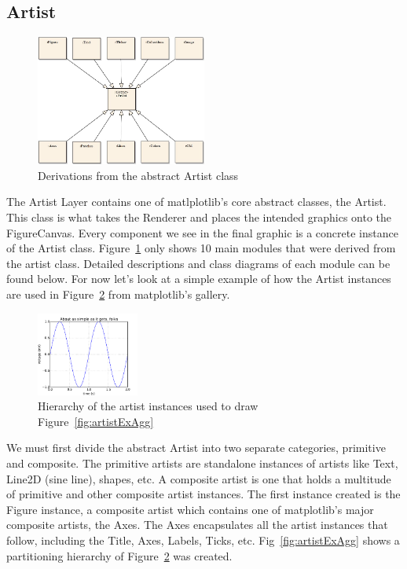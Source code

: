 \documentclass[pdftex,10pt,a4paper]{report}
\begin{document}
\subsection{Artist}
\begin{figure}[ht!]
        \centering
                \includegraphics[width=0.5\textwidth]{img/umls/arch/absArtist}
        \caption{Derivations from the abstract Artist class}\label{fig:absArtist}
\end{figure}
The Artist Layer contains one of matlplotlib's core abstract classes, the Artist. This class is what takes the Renderer and places the intended graphics onto the FigureCanvas. Every component we see in the final graphic is a concrete instance of the Artist class. Figure~\ref{fig:absArtist} only shows 10 main modules that were derived from the artist class. Detailed descriptions and class diagrams of each module can be found below. For now let's look at a simple example of how the Artist instances are used in Figure~\ref{fig:artistEx} from matplotlib's gallery.

\begin{figure}[ht!]
        \centering
                \includegraphics[width=0.3\textwidth]{img/examples/simple_plot}
        \caption{Hierarchy of the artist instances used to draw Figure~\ref{fig:artistExAgg}}\label{fig:artistEx}
\end{figure}

We must first divide the abstract Artist into two separate categories, primitive and composite. The primitive artists are standalone instances of artists like Text, Line2D (sine line), shapes, etc. A composite artist is one that holds a multitude of primitive and other composite artist instances. The first instance created is the Figure instance, a composite artist which contains one of matplotlib's major composite artists, the Axes. The Axes encapsulates all the artist instances that follow, including the Title, Axes, Labels, Ticks, etc. Fig~\ref{fig:artistExAgg} shows a partitioning hierarchy of Figure~\ref{fig:artistEx} was created.
\end{document}
